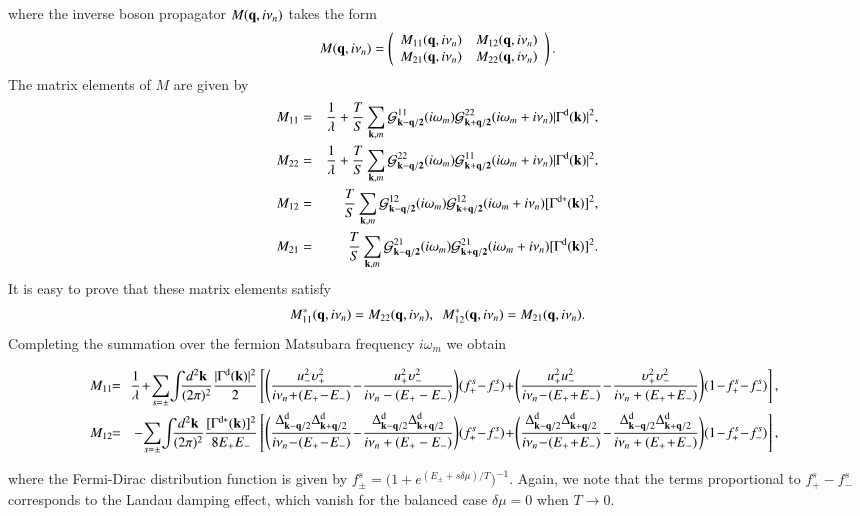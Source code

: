 \documentclass[aps,prd,amsmath,two column,nofootinbib,amssymb,referee]{revtex4}
\begin{document}
where the inverse boson propagator $M({\bf q},i\nu_n)$ takes the form
\begin{eqnarray}
M({\bf q},i\nu_n)=\left(\begin{array}{cc}M_{11}({\bf q},i\nu_n)&M_{12}({\bf q},i\nu_n)\\
M_{21}({\bf q},i\nu_n)& M_{22}({\bf q},i\nu_n)\end{array}\right).
\end{eqnarray}
The matrix elements of $M$ are given by
\begin{eqnarray}
M_{11}&=&{1\over\lambda}+{T\over S}\sum_{{\bf k},m}{\cal G}_{\bf k-q/2}^{11}(i\omega_m){\cal G}_{\bf k+q/2}^{22}(i\omega_m+i\nu_n)|\Gamma^{\rm d}({\bf k})|^2,\nonumber\\
M_{22}&=&{1\over\lambda}+{T\over S}\sum_{{\bf k},m}{\cal G}_{\bf k-q/2}^{22}(i\omega_m){\cal G}_{\bf k+q/2}^{11}(i\omega_m+i\nu_n)|\Gamma^{\rm d}({\bf k})|^2,\nonumber\\
M_{12}&=&{T\over S}\sum_{{\bf k},m}{\cal G}_{\bf k-q/2}^{12}(i\omega_m){\cal G}_{\bf k+q/2}^{12}(i\omega_m+i\nu_n)[\Gamma^{\rm d*}({\bf k})]^2,\nonumber\\
M_{21}&=&{T\over S}\sum_{{\bf k},m}{\cal G}_{\bf k-q/2}^{21}(i\omega_m){\cal G}_{\bf k+q/2}^{21}(i\omega_m+i\nu_n)[\Gamma^{\rm d}({\bf k})]^2.
\end{eqnarray}
It is easy to prove that these matrix elements satisfy 
\begin{eqnarray}
M_{11}^*({\bf q},i\nu_n)=M_{22}({\bf q},i\nu_n),\ \ M_{12}^*({\bf q},i\nu_n)=M_{21}({\bf q},i\nu_n).
\end{eqnarray}
Completing the summation over the fermion Matsubara frequency $i\omega_m$ we obtain
\begin{widetext}
	\begin{eqnarray}\label{matrixd}
\!\!\!	M_{11}\!\!&=&\!\!{1\over\lambda}\!+\!\sum_{s=\pm}\!\int\!\!\! {d^2{\bf k}\over(2\pi)^2}{|\Gamma^{\rm d}({\bf k})|^2\over2}\left[\Bigg({u_-^2\upsilon_+^2\over i\nu_n\!+\!(E_+\!-\!E_-)}\!-\!{u_+^2\upsilon_-^2\over i\nu_n-(E_+-E_-)}\Bigg)(f_+^s\!-\!f_-^s)\!+\!\Bigg({u_+^2u_-^2\over i\nu_n\!-\!(E_+\!+\!E_-)}\!-\!{\upsilon_+^2\upsilon_-^2\over i\nu_n+(E_+\!+\!E_-)}\Bigg)(1\!-\!f_+^s\!-\!f_-^s)\right],\nonumber\\
\!\!\!	M_{12}\!\!&=&\!\!-\!\sum_{s=\pm}\!\int\!\!\! {d^2{\bf k}\over(2\pi)^2}{[\Gamma^{{\rm d}*}({\bf k})]^2\over8E_+E_-}\left[\Bigg({\Delta_{{\bf k}-{\bf q}/2}^{\rm d}\Delta_{{\bf k}+{\bf q}/2}^{\rm d}\over i\nu_n\!-\!(E_+\!-\!E_-)}\!-\!{\Delta_{{\bf k}-{\bf q}/2}^{\rm d}\Delta_{{\bf k}+{\bf q}/2}^{\rm d}\over i\nu_n+(E_+-E_-)}\Bigg)(f_+^s\!-\!f_-^s)\!+\!\Bigg({\Delta_{{\bf k}-{\bf q}/2}^{\rm d}\Delta_{{\bf k}+{\bf q}/2}^{\rm d}\over i\nu_n\!-\!(E_+\!+\!E_-)}\!-\!{\Delta_{{\bf k}-{\bf q}/2}^{\rm d}\Delta_{{\bf k}+{\bf q}/2}^{\rm d}\over i\nu_n+(E_+\!+\!E_-)}\Bigg)(1\!-\!f_+^s\!-\!f_-^s)\right],
	\end{eqnarray}
\end{widetext}
where the Fermi-Dirac distribution function is given by $f_\pm^s=\Big(1+e^{(E_\pm+s\delta\mu)/T}\Big)^{-1}$. Again, we note that the terms proportional to $f_+^s-f_-^s$ corresponds to the Landau damping effect, which vanish for the balanced case $\delta\mu=0$ when $T\rightarrow0$.
\end{document}
